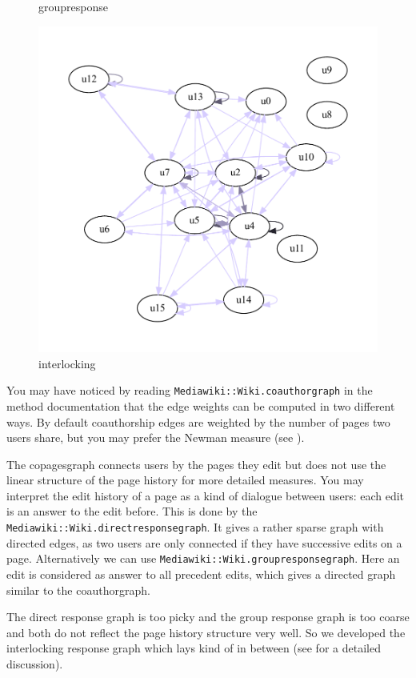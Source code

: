 \documentclass[a4paper]{scrartcl}
\newcommand{\rdoc}[1]{\texttt{\color{help}#1}}
\begin{document}
\begin{figure}
{  \caption{groupresponse}
  \label{fig:gv_grg}}\hfill
  \parbox[b]{.33\textwidth}{
  \includegraphics[width=\linewidth]{gv_ilrg}\vspace{-3ex}
  \caption{interlocking}
  \label{fig:gv_ilrg}}
\end{figure}

You may have noticed by reading \rdoc{Mediawiki::Wiki.coauthorgraph}
in the method documentation that the edge weights can be computed in
two different ways. By default coauthorship edges are weighted by the
number of pages two users share, but you may prefer the Newman measure
(see \cite{Newman:2001zr,Newman:2001mz}).

The copagesgraph connects users by the pages they edit but does not
use the linear structure of the page history for more detailed
measures. You may interpret the edit history of a page as a kind of
dialogue between users: each edit is an answer to the edit
before. This is done by the
\rdoc{Mediawiki::Wiki.directresponsegraph}.  It gives a rather sparse
graph with directed edges, as two users are only connected if they
have successive edits on a page.  Alternatively we can use
\rdoc{Mediawiki::Wiki.groupresponsegraph}. Here an edit is considered
as answer to all precedent edits, which gives a directed graph similar
to the coauthorgraph.

The direct response graph is too picky and the group response graph
is too coarse and both do not reflect the page history structure very
well. So we developed the interlocking response graph which lays kind of
in between (see \cite{Stein/Blaschke:2009a,Blaschke/Stein:2007} for a
detailed discussion).
\end{document}
